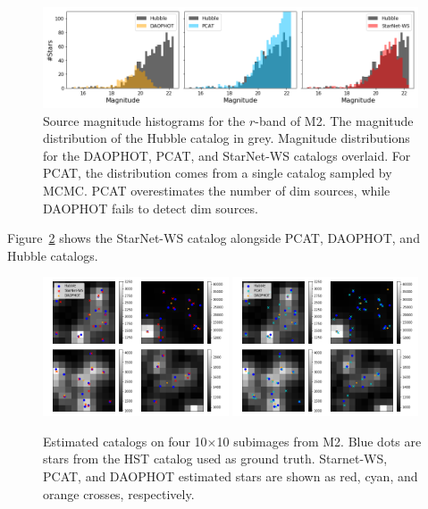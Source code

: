 \begin{figure}[ht]
    \centering
    \includegraphics[width=0.99\textwidth]{figures/luminosity_fun.png}
    \caption{Source magnitude histograms for the $r$-band of M2. 
    The magnitude distribution of the Hubble catalog in grey. 
    Magnitude distributions for the DAOPHOT, PCAT, and StarNet-WS catalogs overlaid.
    For PCAT, the distribution comes from a single catalog sampled by MCMC. 
    PCAT overestimates the number of dim sources, 
    while DAOPHOT fails to detect dim sources. }
    \label{fig:luminosity_fun_m2}
\end{figure}

Figure~\ref{fig:example_subimages} shows the StarNet-WS catalog alongside PCAT, DAOPHOT, and Hubble catalogs. 

\begin{figure}[ht]
    \centering
    \includegraphics[width=0.49\textwidth]{figures/example_subimages_ws.png}
    \includegraphics[width=0.49\textwidth]{figures/example_subimages_pcat.png}
    \caption{Estimated catalogs on four 10$\times$10 subimages from
    M2. Blue dots are stars from the HST catalog used as ground truth. 
    Starnet-WS, PCAT, and DAOPHOT estimated stars are shown as
    red, cyan, and orange crosses, respectively. }
    \label{fig:example_subimages}
\end{figure}

